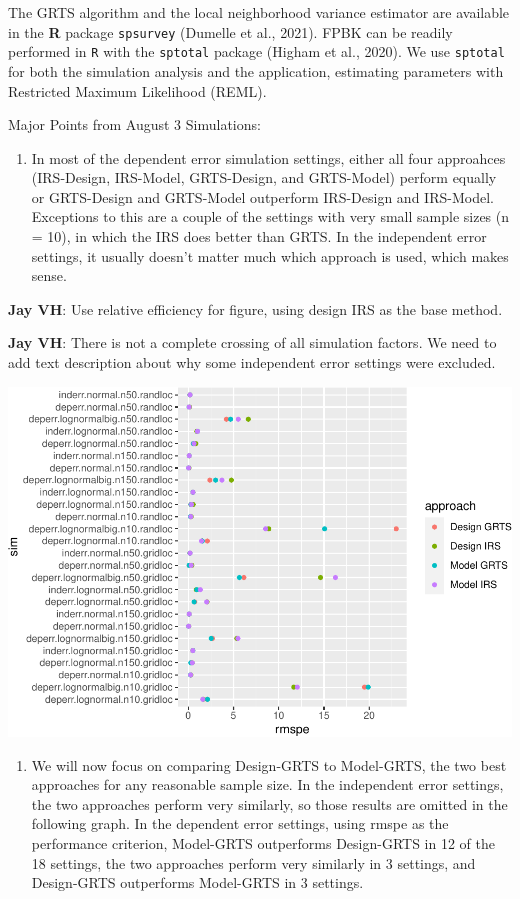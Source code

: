 \documentclass[]{elsarticle} %
\providecommand{\tightlist}{%
  \setlength{\itemsep}{0pt}\setlength{\parskip}{0pt}}
\begin{document}
The GRTS algorithm and the local neighborhood variance estimator are
available in the \textbf{\textsf{R}} package \texttt{spsurvey} (Dumelle
et al., 2021). FPBK can be readily performed in \texttt{R} with the
\texttt{sptotal} package (Higham et al., 2020). We use \texttt{sptotal}
for both the simulation analysis and the application, estimating
parameters with Restricted Maximum Likelihood (REML).

Major Points from August 3 Simulations:

\begin{enumerate}
\def\labelenumi{\arabic{enumi}.}
\tightlist
\item
  In most of the dependent error simulation settings, either all four
  approahces (IRS-Design, IRS-Model, GRTS-Design, and GRTS-Model)
  perform equally or GRTS-Design and GRTS-Model outperform IRS-Design
  and IRS-Model. Exceptions to this are a couple of the settings with
  very small sample sizes (n = 10), in which the IRS does better than
  GRTS. In the independent error settings, it usually doesn't matter
  much which approach is used, which makes sense.
\end{enumerate}

\textbf{Jay VH}: Use relative efficiency for figure, using design IRS as
the base method.

\textbf{Jay VH}: There is not a complete crossing of all simulation
factors. We need to add text description about why some independent
error settings were excluded.

\includegraphics{SpatialDVM_Manuscript_files/figure-latex/unnamed-chunk-4-1.pdf}

\begin{enumerate}
\def\labelenumi{\arabic{enumi}.}
\setcounter{enumi}{1}
\tightlist
\item
  We will now focus on comparing Design-GRTS to Model-GRTS, the two best
  approaches for any reasonable sample size. In the independent error
  settings, the two approaches perform very similarly, so those results
  are omitted in the following graph. In the dependent error settings,
  using rmspe as the performance criterion, Model-GRTS outperforms
  Design-GRTS in 12 of the 18 settings, the two approaches perform very
  similarly in 3 settings, and Design-GRTS outperforms Model-GRTS in 3
  settings.
\end{enumerate}
\end{document}
